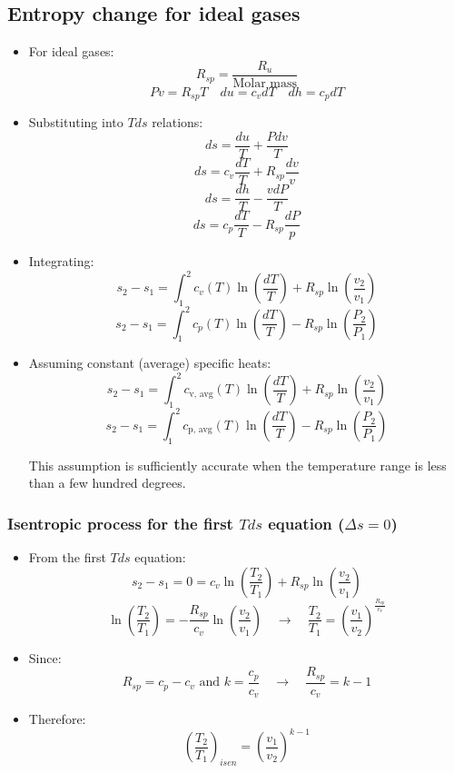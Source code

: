 \documentclass[11pt]{article}
\begin{document}
\subsection{Entropy change for ideal gases}
\label{sec:orgaa2b894}
\begin{itemize}
\item For ideal gases:
\[R_{sp} = \frac{R_u}{\text{Molar mass}}\]
\[Pv = R_{sp} T \quad du = c_v dT \quad dh = c_p dT\]
\item Substituting into \(Tds\) relations:
\[ds = \frac{du}{T} + \frac{P dv}{T}\]
\[ds = c_v \frac{dT}{T} + R_{sp} \frac{dv}{v}\]
\[ds = \frac{dh}{T} - \frac{v dP}{T}\]
\[ds = c_p \frac{dT}{T} - R_{sp} \frac{dP}{p}\]
\item Integrating:
\[s_2 - s_1 = \int_1^2 c_v(T) \ln \left(\frac{dT}{T} \right)+ R_{sp} \ln \left(\frac{v_2}{v_1} \right)\]
\[s_2 - s_1 = \int_1^2 c_p(T) \ln \left(\frac{dT}{T} \right) - R_{sp} \ln \left(\frac{P_2}{P_1} \right)\]
\item Assuming constant (average) specific heats:
\[s_2 - s_1 = \int_1^2 c_{\text{v, avg}}(T) \ln \left(\frac{dT}{T} \right) + R_{sp} \ln \left(\frac{v_2}{v_1} \right)\]
\[s_2 - s_1 = \int_1^2 c_{\text{p, avg}}(T) \ln \left(\frac{dT}{T} \right) - R_{sp} \ln \left(\frac{P_2}{P_1} \right)\]

This assumption is sufficiently accurate when the temperature range is less than a few hundred degrees.
\end{itemize}
\subsubsection{Isentropic process for the first \(Tds\) equation (\(\Delta s = 0\))}
\label{sec:org1a0f231}
\begin{itemize}
\item From the first \(Tds\) equation:
\[s_2 - s_1 = 0 = c_v \ln \left( \frac{T_2}{T_1} \right) + R_{sp} \ln \left( \frac{v_2}{v_1} \right)\]
\[\ln \left(\frac{T_2}{T_1} \right) = - \frac{R_{sp}}{c_v} \ln \left( \frac{v_2}{v_1} \right) \quad \rightarrow \quad \frac{T_2}{T_1} = \left(\frac{v_1}{v_2} \right)^{\frac{R_{sp}}{c_v}}\]

\item Since:
\[R_{sp} = c_p - c_v \text{ and } k = \frac{c_p}{c_v} \quad \rightarrow \quad \frac{R_{sp}}{c_v} = k - 1\]

\item Therefore:
\[\left(\frac{T_2}{T_1} \right)_{isen} = \left(\frac{v_1}{v_2} \right)^{k - 1}\]
\end{itemize}
\end{document}

